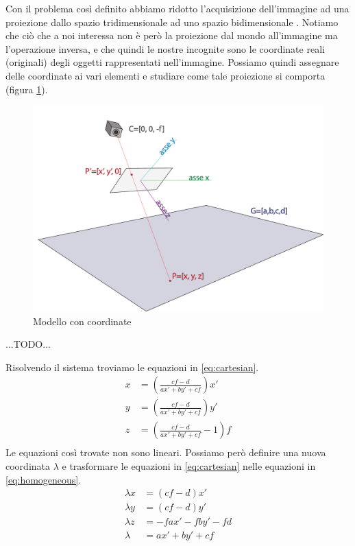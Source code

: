 Con il problema così definito abbiamo ridotto l'acquisizione dell'immagine ad una proiezione dallo spazio tridimensionale ad uno spazio bidimensionale .
Notiamo che ciò che a noi interessa non è però la proiezione dal mondo all'immagine ma l'operazione inversa, e che quindi le nostre incognite sono le coordinate reali (originali) degli oggetti rappresentati nell'immagine.
Possiamo quindi assegnare delle coordinate ai vari elementi e studiare come tale proiezione si comporta (figura \ref{fig:camera coords}).
\begin{figure}
    \caption{Modello con coordinate}
    \label{fig:camera coords}
    \centering
    \includegraphics[width=.85\textwidth]{images/camera coords.pdf}
\end{figure}

\begin{center}
    \hrulefill

    ...TODO...

    \hrulefill
\end{center}

Risolvendo il sistema troviamo le equazioni in \ref{eq:cartesian}.
\begin{equation}
    \label{eq:cartesian}
    \begin{split}
        x & = \left( \frac{cf - d}{ax' + by' + cf} \right) x'\\
        y & = \left( \frac{cf - d}{ax' + by' + cf} \right) y'\\
        z & = \left( \frac{cf - d}{ax' + by' + cf} - 1 \right) f  \\
    \end{split}
\end{equation}
Le equazioni così trovate non sono lineari.
Possiamo però definire una nuova coordinata $\lambda$ e trasformare le equazioni in \ref{eq:cartesian} nelle equazioni in \ref{eq:homogeneous}.
\begin{equation}
    \label{eq:homogeneous}
    \begin{split}
        \lambda x & = (cf - d) x' \\
        \lambda y & = (cf - d) y' \\
        \lambda z & = -fax' - fby' - fd \\
        \lambda  & = ax' + by' + cf\\
    \end{split}
\end{equation}

